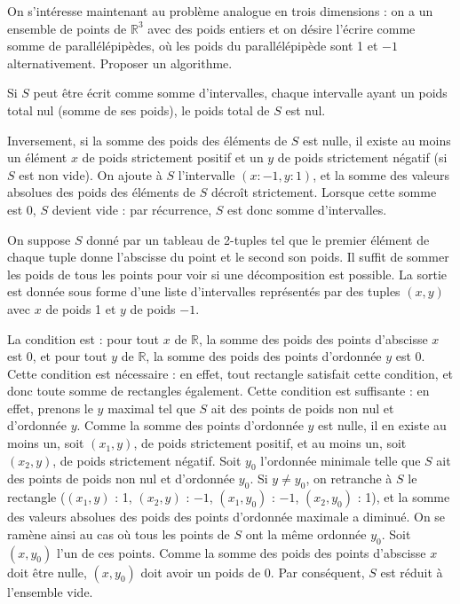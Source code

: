 \Q
On s'intéresse maintenant au problème analogue en trois dimensions : on a un ensemble de points de $\mathbb{R}^3$ avec des poids entiers et on désire l'écrire comme somme de parallélépipèdes, où les poids du parallélépipède sont 1 et $-1$ alternativement. Proposer un algorithme.

\Corrige

\Q
Si $S$ peut être écrit comme somme d'intervalles, chaque intervalle ayant un poids total nul (somme de ses poids), le poids total de $S$ est nul.
\medskip

Inversement, si la somme des poids des éléments de $S$ est nulle, il existe au moins un élément $x$ de poids strictement positif et un $y$ de poids strictement négatif (si $S$ est non vide). On ajoute à $S$ l'intervalle $(x:-1,y:1)$, et la somme des valeurs absolues des poids des éléments de $S$ décroît strictement. Lorsque cette somme est 0, $S$ devient vide : par récurrence, $S$ est donc somme d'intervalles.

\Q
On suppose $S$ donné par un tableau de 2-tuples tel que le premier élément de chaque tuple donne l'abscisse du point et le second son poids. Il suffit de sommer les poids de tous les points pour voir si une décomposition est possible. La sortie est donnée sous forme d'une liste d'intervalles représentés par des tuples $(x,y)$ avec $x$ de poids 1 et $y$ de poids $-1$.



\Q
La condition est : pour tout $x$ de $\mathbb{R}$, la somme des poids des points d'abscisse $x$ est 0, et pour tout $y$ de $\mathbb{R}$, la somme des poids des points d'ordonnée $y$ est 0. Cette condition est nécessaire : en effet, tout rectangle satisfait cette condition, et donc toute somme de rectangles également. Cette condition est suffisante : en effet, prenons le $y$ maximal tel que $S$ ait des points de poids non nul et d'ordonnée $y$. Comme la somme des points d'ordonnée $y$ est nulle, il en existe au moins un, soit $(x_1,y)$, de poids strictement positif, et au moins un, soit $(x_2,y)$, de poids strictement négatif. Soit $y_0$ l'ordonnée minimale telle que $S$ ait des points de poids non nul et d'ordonnée $y_0$. Si $y \neq y_0$, on retranche à $S$ le rectangle ($(x_1,y)$ : 1, $(x_2,y)$ : $-1$, $(x_1,y_0)$ : $-1$, $(x_2,y_0)$ : 1), et la somme des valeurs absolues des poids des points d'ordonnée maximale a diminué. On se ramène ainsi au cas où tous les points de $S$ ont la même ordonnée $y_0$. Soit $(x,y_0)$ l'un de ces points. Comme la somme des poids des points d'abscisse $x$ doit être nulle, $(x,y_0)$ doit avoir un poids de 0. Par conséquent, $S$ est réduit à l'ensemble vide.

